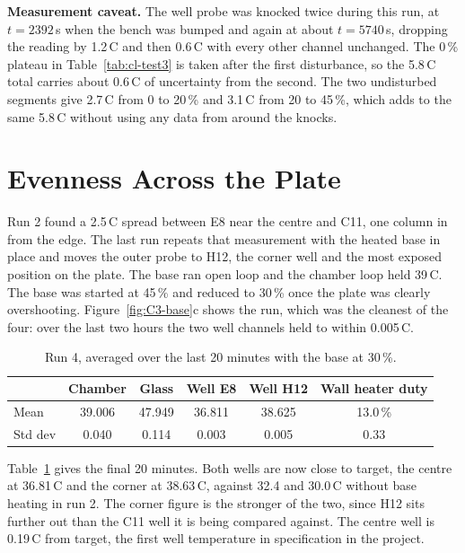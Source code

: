 \textbf{Measurement caveat.} The well probe was knocked twice during this run, at $t = 2392$\,s when the bench was bumped and again at about $t = 5740$\,s, dropping the reading by 1.2\,\textdegree{}C and then 0.6\,\textdegree{}C with every other channel unchanged. The 0\,\% plateau in Table~\ref{tab:cl-test3} is taken after the first disturbance, so the 5.8\,\textdegree{}C total carries about 0.6\,\textdegree{}C of uncertainty from the second. The two undisturbed segments give 2.7\,\textdegree{}C from 0 to 20\,\% and 3.1\,\textdegree{}C from 20 to 45\,\%, which adds to the same 5.8\,\textdegree{}C without using any data from around the knocks.

\section{Evenness Across the Plate}
\label{sec:cl-test4}

Run 2 found a 2.5\,\textdegree{}C spread between E8 near the centre and C11, one column in from the edge. The last run repeats that measurement with the heated base in place and moves the outer probe to H12, the corner well and the most exposed position on the plate. The base ran open loop and the chamber loop held 39\,\textdegree{}C. The base was started at 45\,\% and reduced to 30\,\% once the plate was clearly overshooting. Figure~\ref{fig:C3-base}c shows the run, which was the cleanest of the four: over the last two hours the two well channels held to within 0.005\,\textdegree{}C.

\begin{table}[htbp]
    \centering
    \caption{Run 4, averaged over the last 20 minutes with the base at 30\,\%.}
    \label{tab:cl-test4}
    \small
    \begin{tabular}{lccccc}
        \toprule
         & \textbf{Chamber} & \textbf{Glass} & \textbf{Well E8} & \textbf{Well H12} & \textbf{Wall heater duty} \\
        \midrule
        Mean    & 39.006 & 47.949 & 36.811 & 38.625 & 13.0\,\% \\
        Std dev & 0.040  & 0.114  & 0.003  & 0.005  & 0.33 \\
        \bottomrule
    \end{tabular}
\end{table}

Table~\ref{tab:cl-test4} gives the final 20 minutes. Both wells are now close to target, the centre at 36.81\,\textdegree{}C and the corner at 38.63\,\textdegree{}C, against 32.4 and 30.0\,\textdegree{}C without base heating in run 2. The corner figure is the stronger of the two, since H12 sits further out than the C11 well it is being compared against. The centre well is 0.19\,\textdegree{}C from target, the first well temperature in specification in the project.

